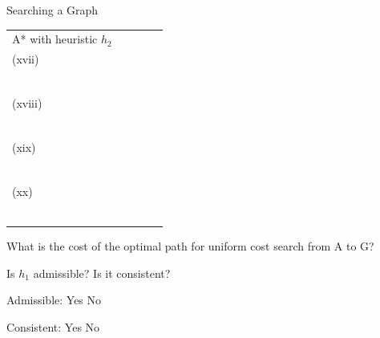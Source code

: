 \begin{problem}{Searching a Graph}
\begin{question}[15]
\begin{table}[h]
\begin{center}
\begin{tabular}{|l|l|l|l|l|}
\hline
A* with heuristic $h_2$ & \begin{minipage}{2cm}~\\(xvii)\quad\solution{}{\Threeaxvii}~\\~\\\end{minipage} &
\begin{minipage}{2cm}~\\(xviii)\quad\solution{}{\Threeaxviii}~\\~\\\end{minipage} & 
\begin{minipage}{2cm}~\\(xix)\quad\solution{}{\Threeaxix}~\\~\\\end{minipage} &
\begin{minipage}{3cm}~\\(xx)\quad\solution{}{\Threeaxx}~\\~\\\end{minipage}\\

\hline
\end{tabular}
\end{center}
\end{table}
  
\end{question}

\begin{question}[2]
What is the cost of the optimal path for uniform cost search from A to G?


\end{question}

\begin{question}[4]
Is $h_1$ admissible? Is it consistent?

Admissible: \hspace{5mm}
\solution{\emptycircle}{\ThreeCAdmissibleYes} Yes
\hspace{5mm}
\solution{\emptycircle}{\ThreeCAdmissibleNo} No

\solution{}{\ThreeCAdmissibleReason}

Consistent: \hspace{5mm}
\solution{\emptycircle}{\ThreeCConsistentYes} Yes
\hspace{5mm}
\solution{\emptycircle}{\ThreeCConsistentNo} No


\end{question}
\end{problem}
